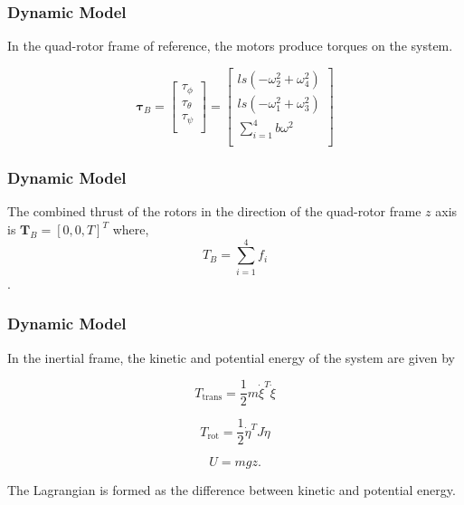 \documentclass{beamer}
\begin{document}
\begin{frame}
\frametitle{Dynamic Model}


In the quad-rotor frame of reference, the motors produce torques on the system.

\begin{equation}
    \label{taub}
    \boldsymbol \tau_B = \left[ \begin{array}{c} \tau_{\phi}\\\tau_{\theta}\\\tau_{\psi}\\ \end{array} \right] = \left[ \begin{array}{c} l s (-\omega_2^2 + \omega_4^2)\\l s (-\omega_1^2 + \omega_3^2)\\ \displaystyle \sum \limits_{i=1}^4 b \omega^2\\\end{array} \right]
\end{equation}

\end{frame}




\begin{frame}
\frametitle{Dynamic Model}


The combined thrust of the rotors in the direction of the quad-rotor frame $z$ axis is $\boldsymbol T_B = [0, 0, T]^T$ where,\\

\begin{equation}
    \label{totalThrust}
    T_B =  \displaystyle \sum \limits_{i=1}^4 f_i
\end{equation}.

\end{frame}



\begin{frame}
\frametitle{Dynamic Model}

In the inertial frame, the kinetic and potential energy of the system are given by

\begin{equation}
    T_{\text{trans}}=\frac{1}{2}m\dot{\xi }^T\dot{\xi }
\end{equation}


\begin{equation}
    T_{\text{rot}}= \frac{1}{2}\dot{\eta }^T J \dot{\eta } 
\end{equation}


\begin{equation}
    U = m g z.
\end{equation}

The Lagrangian is formed as the difference between kinetic and potential energy.
\end{frame}
\end{document}
